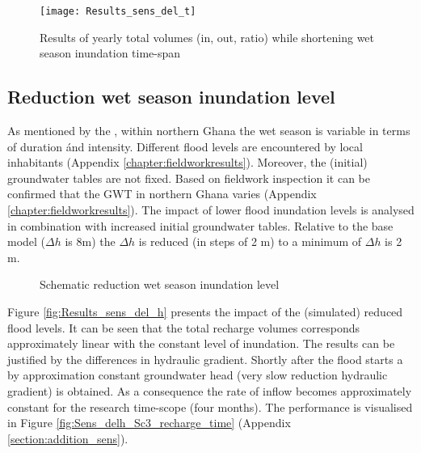 \begin{figure}[h!]
 \centering
 \texttt{[image: Results\_sens\_del\_t]}
 \captionsetup{justification=centering} 
 \caption{Results of yearly total volumes (in, out, ratio) while shortening wet season inundation time-span}
 \label{fig:Results_sens_del_t}
\end{figure}

\subsection{Reduction wet season inundation level}
\label{subsec:Sens_del_h}
As mentioned by the \citet{HAP2011}, within northern Ghana the wet season is variable in terms of duration ánd intensity. Different flood levels are encountered by local inhabitants (Appendix \ref{chapter:fieldworkresults}). Moreover, the (initial) groundwater tables are not fixed. Based on fieldwork inspection it can be confirmed that the GWT in northern Ghana varies (Appendix \ref{chapter:fieldworkresults}). The impact of lower flood inundation levels is analysed in combination with increased initial groundwater tables. Relative to the base model ($\Delta h$ is 8m) the $\Delta h$ is reduced (in steps of 2 m) to a minimum of $\Delta h$ is 2 m.

\begin{figure}[H]
\centering
{}
\captionsetup{justification=centering}
\caption{Schematic reduction wet season inundation level}
\label{fig:Schematic_sens_del_h}
\end{figure}

Figure \ref{fig:Results_sens_del_h} presents the impact of the (simulated) reduced flood levels. It can be seen that the total recharge volumes corresponds approximately linear with the constant level of inundation. The results can be justified by the differences in hydraulic gradient. Shortly after the flood starts a by approximation constant groundwater head (very slow reduction hydraulic gradient) is obtained. As a consequence the rate of inflow becomes approximately constant for the research time-scope (four months). The performance is visualised in Figure \ref{fig:Sens_delh_Sc3_recharge_time} (Appendix \ref{section:addition_sens}).   

